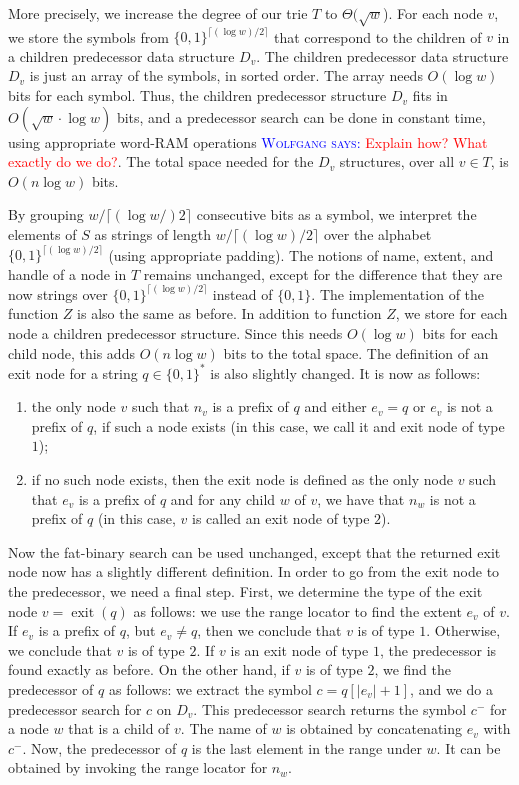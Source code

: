 \documentclass[a4paper,11pt]{article}
\newcommand{\?}{\mskip1.5mu}
\DeclareMathOperator{\exit}{exit}
\newcommand{\aremark}[3]{\textcolor{blue}{\textsc{#1 #2:}}
  \textcolor{red}{\textsf{#3}}}
\newcommand{\wolfgang}[2][says]{\aremark{Wolfgang}{#1}{#2}}
\begin{document}
More precisely, we increase the degree of our trie $T$ 
to $\Theta(\sqrt{w}$). For each node 
$v$, we store the symbols from 
$\{0, 1\}^{\lceil (\log w )/ 2 \rceil}$
that correspond to the children of $v$
in a children predecessor data 
structure $D_v$. 
The children predecessor data structure 
$D_v$ is just an array of the symbols, in sorted order. 
The array needs $O(\log w)$ bits for each symbol.
Thus, the children predecessor structure $D_v$ fits in 
$O(\sqrt{w} \cdot {\log w})$ bits, and a predecessor search can 
be done in constant time, using appropriate word-RAM operations
\wolfgang{Explain how? What exactly do we do?}. 
The total space needed for the $D_v$ structures, over all $v \in T$,
is $O(n\log w)$ bits. 

By grouping
$w/\lceil(\log w/)2\rceil$ consecutive 
bits as a symbol, we interpret the 
elements of $S$ as strings of length $w/\lceil(\log w)/2\rceil$ 
over the alphabet $\{0, 1\}^{\lceil (\log w) / 2 \rceil}$ (using
appropriate padding).
The notions of name, 
extent, and handle of a node in $T$ remains unchanged, except for 
the difference that they are now strings over 
$\{0, 1\}^{\lceil(\log w)/2\rceil}$ instead of $\{0,1\}$. 
The implementation of the function $Z$ is also the same as before. 
In addition to function $Z$, we store for each node a children
predecessor structure. Since this needs $O(\log w)$ bits for each
child node, this adds 
$O(n\log w)$ bits to the total space. 
The definition of an exit node for a string $q \in \{0, 1\}^*$ 
is also slightly changed. 
It is now as follows:
\begin{enumerate}
\item the only node $v$ such that $n_v$ is a prefix of $q$ and 
either $e_v = q$ or $e_v$ is not a prefix of $q$, 
if such a node exists (in this case, we call it 
and exit node of type $1$); 
\item if no such node exists, then the exit node 
is defined as the only node $v$ such that $e_v$ is a prefix of 
$q$ and for any child $w$ of $v$, we have that $n_w$ is not a prefix of 
$q$ (in this case, $v$ is called an exit node of type $2$). 
\end{enumerate}

Now the fat-binary search can be used unchanged, 
except that the returned exit node now has a slightly 
different definition. In order to go from the exit node
to the predecessor, we need a final step. 
First, we determine the type of the exit node 
$v = \exit(q)$ as follows: we use the range locator to 
find the extent $e_v$ of $v$. If $e_v$ is a prefix of $q$, but 
$e_v \neq q$, then we conclude that $v$ is of type $1$. 
Otherwise, we conclude that $v$ is of type $2$. 
If $v$ is an exit node of type $1$, the predecessor is found 
exactly as before. On the other hand, 
if $v$  is of type $2$, we find the predecessor of $q$ as follows: we 
extract the symbol $c = q[|e_v| + 1]$, and we do a predecessor 
search for $c$ on $D_v$. This predecessor search returns the 
symbol $c^-$ for a node $w$ that is a child of $v$. The name of $w$ is
obtained by concatenating $e_v$ with $c^-$. Now, the predecessor 
of $q$ is the last element in the range under $w$. It 
can be obtained by invoking the range locator for $n_w$. 
\end{document}
